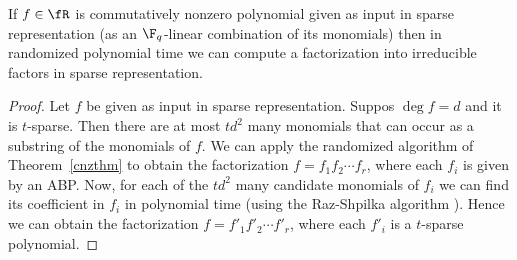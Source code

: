 \begin{corollary}\label{sparse-cor1}
If $f\in\fR$ is commutatively nonzero polynomial given as input in
sparse representation (as an $\F_q$-linear combination of its
monomials) then in randomized polynomial time we can compute
a factorization into irreducible factors in sparse representation.
\end{corollary}

\begin{proof}
  Let $f$ be given as input in sparse representation. Suppos $\deg f =
  d$ and it is $t$-sparse. Then there are at most $td^2$ many
  monomials that can occur as a substring of the monomials of $f$.  We
  can apply the randomized algorithm of Theorem~\ref{cnzthm} to obtain
  the factorization $f=f_1f_2\cdots f_r$, where each $f_i$ is given by
  an ABP. Now, for each of the $td^2$ many candidate monomials of
  $f_i$ we can find its coefficient in $f_i$ in polynomial time (using
  the Raz-Shpilka algorithm \cite{RS05}). Hence we can obtain the
  factorization $f=f'_1f'_2\cdots f'_r$, where each $f'_i$ is a
  $t$-sparse polynomial.
\end{proof}
